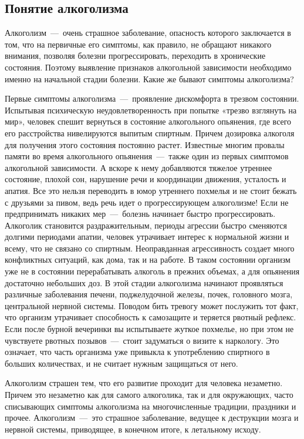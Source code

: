 \documentclass[14pt]{extarticle}
\begin{document}
\subsection{Понятие алкоголизма}

Алкоголизм~---~очень страшное заболевание, опасность которого заключается в том, что на первичные его симптомы, как правило, не обращают никакого внимания, позволяя болезни прогрессировать, переходить в хронические состояния. Поэтому выявление признаков алкогольной зависимости необходимо именно на начальной стадии болезни. Какие же бывают симптомы алкоголизма?

Первые симптомы алкоголизма~---~проявление дискомфорта в трезвом состоянии. Испытывая психическую неудовлетворенность при попытке «трезво взглянуть на мир», человек спешит вернуться в состояние алкогольного опьянения, где всего его расстройства нивелируются выпитым спиртным. Причем дозировка алкоголя для получения этого состояния постоянно растет. Известные многим провалы памяти во время алкогольного опьянения~---~также один из первых симптомов алкогольной зависимости. А вскоре к нему добавляются тяжелое утреннее состояние, плохой сон, нарушение речи и координации движения, усталость и апатия. Все это нельзя переводить в юмор утреннего похмелья и не стоит бежать с друзьями за пивом, ведь речь идет о прогрессирующем алкоголизме! Если не предпринимать никаких мер~---~болезнь начинает быстро прогрессировать. Алкоголик становится раздражительным, периоды агрессии быстро сменяются долгими периодами апатии, человек утрачивает интерес к нормальной жизни и всему, что не связано со спиртным. Неоправданная агрессивность создает много конфликтных ситуаций, как дома, так и на работе. В таком состоянии организм уже не в состоянии перерабатывать алкоголь в прежних объемах, а для опьянения достаточно небольших доз. В этой стадии алкоголизма начинают проявляться различные заболевания печени, поджелудочной железы, почек, головного мозга, центральной нервной системы. Поводом бить тревогу может послужить тот факт, что организм утрачивает способность к самозащите и теряется рвотный рефлекс. Если после бурной вечеринки вы испытываете жуткое похмелье, но при этом не чувствуете рвотных позывов~---~стоит задуматься о визите к наркологу. Это означает, что часть организма уже привыкла к употреблению спиртного в больших количествах, и не считает нужным защищаться от него.

Алкоголизм страшен тем, что его развитие проходит для человека незаметно. Причем это незаметно как для самого алкоголика, так и для окружающих, часто списывающих симптомы алкоголизма на многочисленные традиции, праздники и прочее. Алкоголизм~---~это страшное заболевание, ведущее к деструкции мозга и нервной системы, приводящее, в конечном итоге, к летальному исходу.
\end{document}
